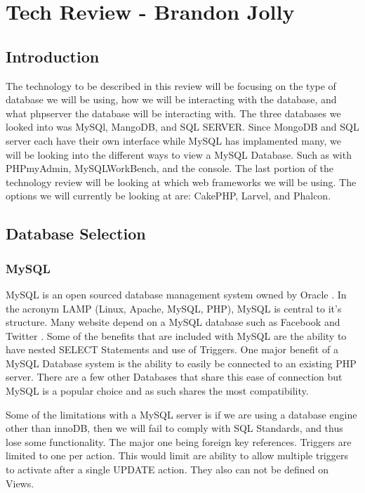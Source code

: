 \documentclass[onecolumn, draftclsnofoot,10pt, compsoc]{IEEEtran}
\begin{document}
 \section{Tech Review - Brandon Jolly}
 \subsection{Introduction}

The technology to be described in this review will be focusing on the type of database we will be using, how we will be interacting with the database, and what phpserver the database will be interacting with. The three databases we looked into was MySQl, MangoDB, and SQL SERVER. Since MongoDB and SQL server each have their own interface while MySQL has implamented many, we will be looking into the different ways to view a MySQL Database. Such as with PHPmyAdmin, MySQLWorkBench, and the console. The last portion of the technology review will be looking at which web frameworks we will be using. The options we will currently be looking at are: CakePHP, Larvel, and Phalcon.

\subsection{Database Selection}
\subsubsection{MySQL}

MySQL is an open sourced database management system owned by Oracle \cite{oracle}.
In the acronym LAMP (Linux, Apache, MySQL, PHP), MySQL is central to it’s structure.
Many website depend on a MySQL database such as Facebook and Twitter \cite{O_Reilly}.
Some of the benefits that are included with MySQL are the ability to have nested SELECT Statements and use of Triggers. 
One major benefit of a MySQL Database system is the ability to easily be connected to an existing PHP server. 
There are a few other Databases that share this ease of connection but MySQL is a popular choice and as such shares the most compatibility.

Some of the limitations with a MySQL server is if we are using a database engine other than innoDB, then we will fail to comply with SQL Standards, and thus lose some functionality.
The major one being foreign key references.
Triggers are limited to one per action.
This would limit are ability to allow multiple triggers to activate after a single UPDATE action.
They also can not be defined on Views. 
\end{document}
